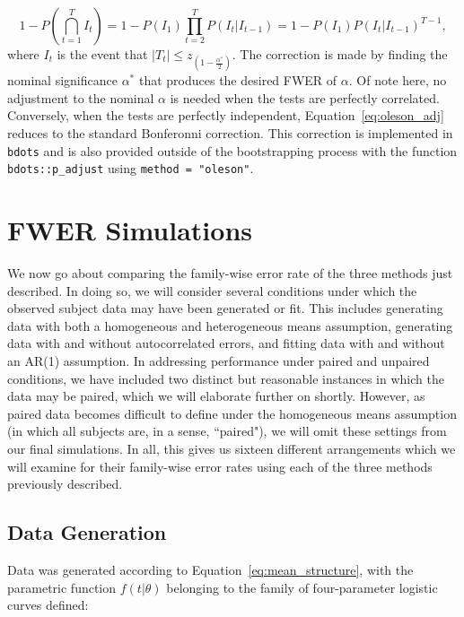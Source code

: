 \documentclass{article}
\newcommand{\xt}{\texttt}
\begin{document}
\begin{equation}\label{eq:oleson_adj}
1 - P \left( \bigcap_{t=1}^T I_t \right) = 1 - P(I_1) \prod_{t=2}^T P(I_t | I_{t-1}) = 1 - P(I_1)P(I_t|I_{t-1})^{T-1},
\end{equation}
where $I_t$ is the event that $|T_t| \leq z_{\left(1 - \frac{\alpha^*}{2} \right)}$. The correction is made by finding the nominal significance $\alpha^*$ that produces the desired FWER of $\alpha$. Of note here, no adjustment to the nominal $\alpha$ is needed when the tests are perfectly correlated. Conversely, when the tests are perfectly independent, Equation~\ref{eq:oleson_adj} reduces to the standard Bonferonni correction. This correction is implemented in \xt{bdots} and is also provided outside of the bootstrapping process with the function \xt{bdots::p\_adjust} using \xt{method = "oleson"}.

\section{FWER Simulations}

We now go about comparing the family-wise error rate of the three methods just described. In doing so, we will consider several conditions under which the observed subject data may have been generated or fit. This includes generating data with both a homogeneous and heterogeneous means assumption, generating data with and without autocorrelated errors, and fitting data with and without an AR(1) assumption. In addressing performance under paired and unpaired conditions, we have included two distinct but reasonable instances in which  the data may be paired, which we will elaborate further on shortly. However, as paired data becomes difficult to define under the homogeneous means assumption (in which all subjects are, in a sense, ``paired"), we will omit these settings from our final simulations. In all, this gives us sixteen different arrangements which we will examine for their family-wise error rates using each of the three methods previously described.



\subsection{Data Generation}

Data was generated according to Equation~\ref{eq:mean_structure}, with the parametric function $f(t|\theta)$ belonging to the family of four-parameter logistic curves defined:
\end{document}
